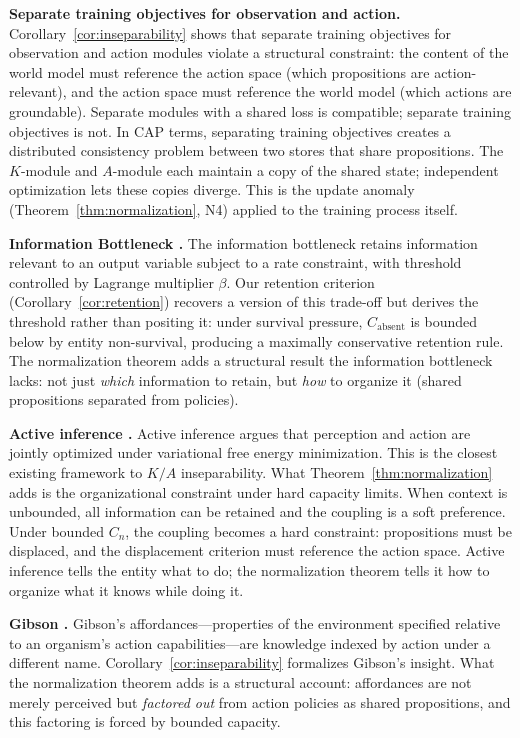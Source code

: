 \documentclass[11pt]{article}
\theoremstyle{definition}
\theoremstyle{remark}
\begin{document}
\textbf{Separate training objectives for observation and action.}
Corollary~\ref{cor:inseparability} shows that separate
training objectives for observation and action modules violate a
structural constraint: the content of the world model must reference
the action space (which propositions are action-relevant), and the
action space must reference the world model (which actions are
groundable). Separate modules with a shared loss is compatible;
separate training objectives is not. In CAP terms, separating training
objectives creates a distributed consistency problem between two
stores that share propositions. The $K$-module and $A$-module each
maintain a copy of the shared state; independent optimization lets
these copies diverge. This is the update anomaly
(Theorem~\ref{thm:normalization}, N4) applied to the training process
itself.

\textbf{Information Bottleneck \cite{Tishby2000, Tishby2011}.}
The information bottleneck retains information relevant to an output
variable subject to a rate constraint, with threshold controlled by
Lagrange multiplier $\beta$. Our retention criterion
(Corollary~\ref{cor:retention}) recovers a version of this trade-off
but derives the threshold rather than positing it: under survival
pressure, $C_{\text{absent}}$ is bounded below by entity non-survival,
producing a maximally conservative retention rule. The normalization
theorem adds a structural result the information bottleneck lacks:
not just \emph{which} information to retain, but \emph{how} to
organize it (shared propositions separated from policies).

\textbf{Active inference \cite{Friston2010, ParrPezzuloFriston2022}.}
Active inference argues that perception and action are jointly optimized
under variational free energy minimization. This is the closest existing
framework to $K/A$ inseparability. What
Theorem~\ref{thm:normalization} adds is the organizational constraint
under hard capacity limits. When context is unbounded, all information
can be retained and the coupling is a soft preference. Under bounded
$C_n$, the coupling becomes a hard constraint: propositions must be
displaced, and the displacement criterion must reference the action
space. Active inference tells the entity what to do; the normalization
theorem tells it how to organize what it knows while doing it.

\textbf{Gibson \cite{Gibson1979}.}
Gibson's affordances---properties of the environment specified relative to
an organism's action capabilities---are knowledge indexed by action under
a different name. Corollary~\ref{cor:inseparability} formalizes Gibson's
insight. What the normalization theorem adds is a structural account:
affordances are not merely perceived but \emph{factored out} from action
policies as shared propositions, and this factoring is forced by bounded
capacity.
\end{document}

